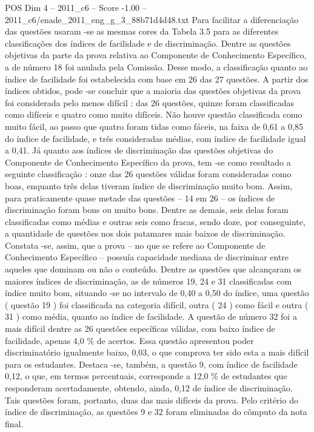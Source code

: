 \begin{textsample}{POS Dim 4 – 2011\_c6 – Score -1.00 – 2011\_c6/enade\_2011\_eng\_g\_3\_88b71d4d48.txt}
Para facilitar a diferenciação das questões usaram -se as mesmas cores da Tabela 3.5 para as diferentes classificações dos índices de facilidade e de discriminação.
Dentre as questões objetivas da parte da prova relativa ao Componente de Conhecimento Específico, a de número 18 foi anulada pela Comissão.
Desse modo, a classificação quanto ao índice de facilidade foi estabelecida com base em 26 das 27 questões.
A partir dos índices obtidos, pode -se concluir que a maioria das questões objetivas da prova foi considerada pelo menos difícil : das 26 questões, quinze foram classificadas como difíceis e quatro como muito difíceis.
Não houve questão classificada como muito fácil, ao passo que quatro foram tidas como fáceis, na faixa de 0,61 a 0,85 do índice de facilidade, e três consideradas médias, com índice de facilidade igual a 0,41.
Já quanto aos índices de discriminação das questões objetivas do Componente de Conhecimento Específico da prova, tem -se como resultado a seguinte classificação : onze das 26 questões válidas foram consideradas como boas, enquanto três delas tiveram índice de discriminação muito bom.
Assim, para praticamente quase metade das questões – 14 em 26 – os índices de discriminação foram bons ou muito bons.
Dentre as demais, seis delas foram classificadas como médias e outras seis como fracas, sendo doze, por conseguinte, a quantidade de questões nos dois patamares mais baixos de discriminação.
Constata -se, assim, que a prova – no que se refere ao Componente de Conhecimento Específico – possuía capacidade mediana de discriminar entre aqueles que dominam ou não o conteúdo.
Dentre as questões que alcançaram os maiores índices de discriminação, as de números 19, 24 e 31 classificadas com índice muito bom, situando -se no intervalo de 0,40 a 0,50 do índice, uma questão ( questão 19 ) foi classificada na categoria difícil, outra ( 24 ) como fácil e outra ( 31 ) como média, quanto ao índice de facilidade.
A questão de número 32 foi a mais difícil dentre as 26 questões específicas válidas, com baixo índice de facilidade, apenas 4,0 \% de acertos.
Essa questão apresentou poder discriminatório igualmente baixo, 0,03, o que comprova ter sido esta a mais difícil para os estudantes.
Destaca -se, também, a questão 9, com índice de facilidade 0,12, o que, em termos percentuais, corresponde a 12,0 \% de estudantes que responderam acertadamente, obtendo, ainda, 0,12 de índice de discriminação.
Tais questões foram, portanto, duas das mais difíceis da prova.
Pelo critério do índice de discriminação, as questões 9 e 32 foram eliminadas do cômputo da nota final.

\end{textsample}
